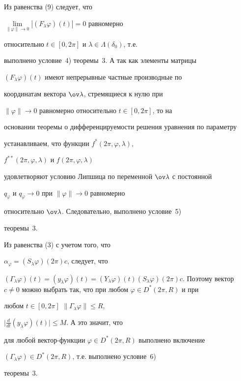  


Из равенства (9) следует, что 


$\lim\limits_{\|\varphi\|\to0}|(F_\lambda\varphi)(t)|=0$ равномерно 


относительно $t\in[0,2\pi]$ и $\lambda\in\Lambda(\delta_0)$, т.е. 


выполнено условие~4) теоремы~3. А так как элементы матрицы 


$(F_\lambda\varphi)(t)$ имеют непрерывные частные производные по 


координатам вектора $\ov\lambda$, стремящиеся к нулю при 


$\|\varphi\|\to0$ равномерно относительно $t\in[0,2\pi]$, то на 


основании теоремы о дифференцируемости решения уравнения по параметру 


устанавливаем, что функции $f^*(2\pi,\varphi,\lambda)$, 


$f^{**}(2\pi,\varphi,\lambda)$ и $f(2\pi,\varphi,\lambda)$ 


удовлетворяют условию Липшица по переменной $\ov\lambda$ с постоянной 


$q_\varphi$ и $q_\varphi\to0$ при $\|\varphi\|\to0$ равномерно 


относительно $\ov\lambda$. Следовательно, выполнено условие~5) 


теоремы~3. 


 


Из равенства (3) с учетом того, что 


$\alpha_\varphi=(S_\lambda\varphi)(2\pi)c$, следует, что 


$(\Gamma_\lambda\varphi)(t)=(y_\lambda\varphi)(t)= 


(Y_\lambda\varphi)(t)(S_\lambda\varphi)(2\pi)c$. Поэтому вектор $c\ne 


0$ можно выбрать так, что при любом $\varphi\in D^*(2\pi,R)$ и при 


любом $t\in[0,2\pi]$\; $\|\Gamma_\lambda\varphi\|\le R$, 


$\big|\frac{d}{dt}(y_\lambda\varphi)(t)\big|\le M$. А это значит, что 


для любой вектор-функции $\varphi\in D^*(2\pi,R)$ выполнено включение 


$(\Gamma_\lambda\varphi)\in D^*(2\pi,R)$, т.е. выполнено условие~6) 


теоремы~3. 


 


